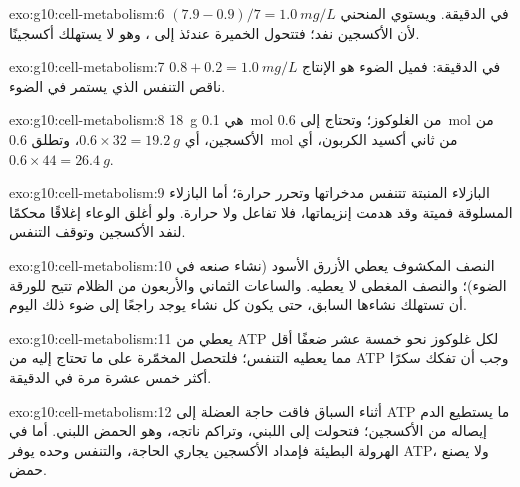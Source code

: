 \begin{solution}{exo:g10:cell-metabolism:6}
$(7.9 - 0.9)/7 = \qty{1.0}{mg/L}$ في الدقيقة. ويستوي المنحني لأن
الأكسجين نفد؛ فتتحول الخميرة عندئذ إلى ، وهو لا يستهلك أكسجينًا.
\end{solution}

\begin{solution}{exo:g10:cell-metabolism:7}
$0.8 + 0.2 = \qty{1.0}{mg/L}$ في الدقيقة: فميل الضوء هو الإنتاج ناقص
التنفس الذي يستمر في الضوء.
\end{solution}

\begin{solution}{exo:g10:cell-metabolism:8}
\qty{18}{g} هي \qty{0.1}{mol} من الغلوكوز؛ وتحتاج إلى \qty{0.6}{mol}
من الأكسجين، أي $0.6 \times 32 = \qty{19.2}{g}$، وتطلق \qty{0.6}{mol}
من ثاني أكسيد الكربون، أي $0.6 \times 44 = \qty{26.4}{g}$.
\end{solution}

\begin{solution}{exo:g10:cell-metabolism:9}
البازلاء المنبتة تتنفس مدخراتها وتحرر حرارة؛ أما البازلاء المسلوقة
فميتة وقد هدمت إنزيماتها، فلا تفاعل ولا حرارة. ولو أغلق الوعاء إغلاقًا
محكمًا لنفد الأكسجين وتوقف التنفس.
\end{solution}

\begin{solution}{exo:g10:cell-metabolism:10}
النصف المكشوف يعطي الأزرق الأسود (نشاء صنعه  في الضوء)؛
والنصف المغطى لا يعطيه. والساعات الثماني والأربعون من الظلام تتيح
للورقة أن تستهلك نشاءها السابق، حتى يكون كل نشاء يوجد راجعًا إلى ضوء
ذلك اليوم.
\end{solution}

\begin{solution}{exo:g10:cell-metabolism:11}
 يعطي من ATP لكل غلوكوز نحو خمسة عشر ضعفًا أقل مما يعطيه التنفس؛
فلتحصل  المخمّرة على ما تحتاج إليه من ATP وجب أن تفكك سكرًا أكثر
خمس عشرة مرة في الدقيقة.
\end{solution}

\begin{solution}{exo:g10:cell-metabolism:12}
أثناء السباق فاقت حاجة العضلة إلى ATP ما يستطيع الدم إيصاله من
الأكسجين؛ فتحولت  إلى  اللبني، وتراكم ناتجه، وهو الحمض
اللبني. أما في الهرولة البطيئة فإمداد الأكسجين يجاري الحاجة، والتنفس
وحده يوفر ATP، ولا يصنع حمض.
\end{solution}

